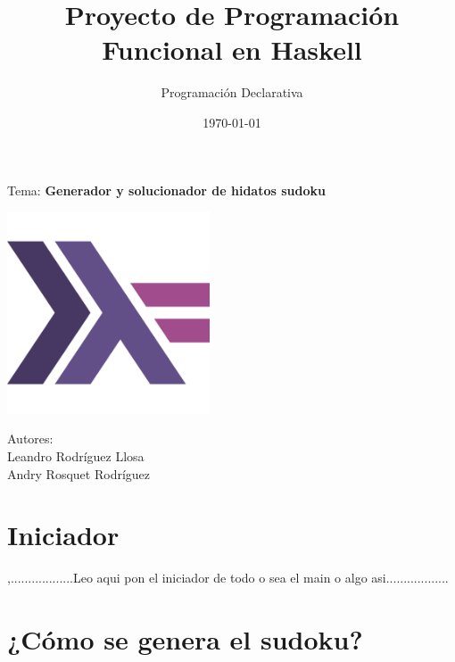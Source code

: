 \documentclass[10pt]{amsart}
\title{Proyecto de Programaci\'on Funcional en Haskell}
\author{Programaci\'on Declarativa}
\date{\today}
\begin{document}
	\begin{titlepage}
		\clearpage
		\maketitle
		
		\vspace{3em}
		\begin{center}
			Tema: \textbf{Generador y solucionador de hidatos sudoku} 	

                \vspace{6em}
                \begin{center}
        		\includegraphics[width=6cm]{haskell.png}
        	\end{center}

			\vspace{6em}
			Autores: \\
			Leandro Rodríguez Llosa \\
			Andry Rosquet Rodríguez
		\end{center}
		\thispagestyle{empty}
	\end{titlepage}

        \normalsize
 
	\small
	
        \section*{Iniciador}
	,..................Leo aqui pon el iniciador de todo o sea el main o algo asi.................. 
	\section*{ ¿C\'omo se genera el sudoku?}
	
\end{document}
